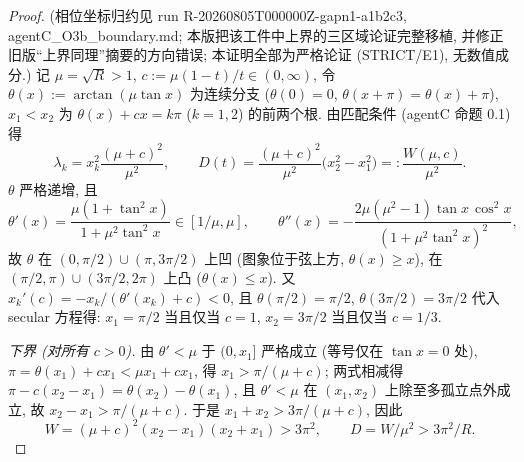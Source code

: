 \documentclass[UTF8]{ctexart}
\begin{document}
\begin{proof}
(相位坐标归约见 run R-20260805T000000Z-gapn1-a1b2c3, agentC\_O3b\_boundary.md; 本版把该工件中上界的三区域论证完整移植, 并修正旧版``上界同理''摘要的方向错误; 本证明全部为严格论证 (STRICT/E1), 无数值成分.)
记 $\mu=\sqrt R>1$, $c:=\mu(1-t)/t\in(0,\infty)$, 令
$\theta(x):=\arctan(\mu\tan x)$ 为连续分支 ($\theta(0)=0$, $\theta(x+\pi)=\theta(x)+\pi$),
$x_1<x_2$ 为 $\theta(x)+cx=k\pi$ ($k=1,2$) 的前两个根. 由匹配条件 (agentC 命题 0.1) 得
\begin{equation}
	\lambda_k=x_k^2\frac{(\mu+c)^2}{\mu^2},\qquad
	D(t)=\frac{(\mu+c)^2}{\mu^2}\bigl(x_2^2-x_1^2\bigr)=:\frac{W(\mu,c)}{\mu^2}.
\end{equation}
$\theta$ 严格递增, 且
\begin{equation}
	\theta'(x)=\frac{\mu(1+\tan^2x)}{1+\mu^2\tan^2x}\in[1/\mu,\mu],
	\qquad
	\theta''(x)=-\frac{2\mu(\mu^2-1)\tan x\,\cos^2x}{(1+\mu^2\tan^2x)^2},
\end{equation}
故 $\theta$ 在 $(0,\pi/2)\cup(\pi,3\pi/2)$ 上凹 (图象位于弦上方, $\theta(x)\ge x$),
在 $(\pi/2,\pi)\cup(3\pi/2,2\pi)$ 上凸 ($\theta(x)\le x$). 又
$x_k'(c)=-x_k/(\theta'(x_k)+c)<0$, 且 $\theta(\pi/2)=\pi/2$, $\theta(3\pi/2)=3\pi/2$
代入 secular 方程得: $x_1=\pi/2$ 当且仅当 $c=1$, $x_2=3\pi/2$ 当且仅当 $c=1/3$.

\emph{下界 (对所有 $c>0$).} 由 $\theta'<\mu$ 于 $(0,x_1]$ 严格成立 (等号仅在
$\tan x=0$ 处), $\pi=\theta(x_1)+cx_1<\mu x_1+cx_1$, 得 $x_1>\pi/(\mu+c)$;
两式相减得 $\pi-c(x_2-x_1)=\theta(x_2)-\theta(x_1)$, 且 $\theta'<\mu$ 在
$(x_1,x_2)$ 上除至多孤立点外成立, 故 $x_2-x_1>\pi/(\mu+c)$. 于是
$x_1+x_2>3\pi/(\mu+c)$, 因此
\begin{equation}
	W=(\mu+c)^2(x_2-x_1)(x_2+x_1)>3\pi^2,\qquad
	D=W/\mu^2>3\pi^2/R.
\end{equation}


\end{proof}
\end{document}
